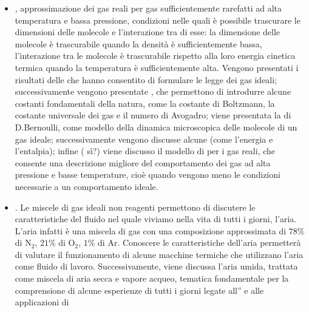 \documentclass[letterpaper,10pt,italian]{jupyterBook}
\begin{document}
\begin{itemize}
\item {} 
\sphinxAtStartPar
{\hyperref[\detokenize{ch/thermodynamics/ideal-gas:physics-hs-thermodynamics-matter-gases-ideal}]{}}, approssimazione dei gas reali per gas sufficientemente rarefatti ad alta temperatura e bassa pressione, condizioni nelle quali è possibile trascurare le dimensioni delle molecole e l’interazione tra di esse: la dimensione delle molecole è trascurabile quando la densità è sufficientemente bassa, l’interazione tra le molecole è trascurabile rispetto alla loro energia cinetica termica quando la temperatura è sufficientemente alta. Vengono presentati i risultati delle {\hyperref[\detokenize{ch/thermodynamics/ideal-gas-experiments:physics-hs-thermodynamics-matter-gases-ideal-experiments}]{}} che hanno consentito di formulare le legge dei gas ideali; successivamente vengono presentate {\hyperref[\detokenize{ch/thermodynamics/ideal-gas-expressions:physics-hs-thermodynamics-matter-gases-ideal-expressions}]{}}, che permettono di introdurre alcune costanti fondamentali della natura, come la costante di Boltzmann, la costante universale dei gas e il numero di Avogadro; viene presentata la {\hyperref[\detokenize{ch/thermodynamics/ideal-gas-kinetic-theory:physics-hs-thermodynamics-matter-gases-ideal-kinetic-theory}]{}} di D.Bernoulli, come modello della dinamica microscopica delle molecole di un gas ideale; successivamente vengono discusse alcune  (come l’energia e l’entalpia); infine ( sì?) viene discusso il modello di  per i gas reali, che consente una descrizione migliore del comportamento dei gas ad alta pressione e basse temperature, cioè quando vengono meno le condizioni necessarie a un comportamento ideale.

\item {} 
\sphinxAtStartPar
{\hyperref[\detokenize{ch/thermodynamics/gas-mixture:physics-hs-thermodynamics-matter-gases-mixture}]{}}. Le miscele di gas ideali non reagenti permettono di discutere le caratteristiche del fluido nel quale viviamo nella vita di tutti i giorni, l’aria. L’aria infatti è una miscela di gas con una composizione approssimata di \(78\%\) di \(\text{N}_2\), \(21\%\) di \(\text{O}_2\), \(1\%\) di \(\text{Ar}\). Conoscere le caratteristiche dell’aria permetterà di valutare il funzionamento di alcune macchine termiche che utilizzano l’aria come fluido di lavoro. Successivamente, viene discussa l’aria umida, trattata come miscela di aria secca e vapore acqueo, tematica fondamentale per la comprensione di alcune esperienze di tutti i giorni legate all” e alle applicazioni di 


\end{itemize}
\end{document}
